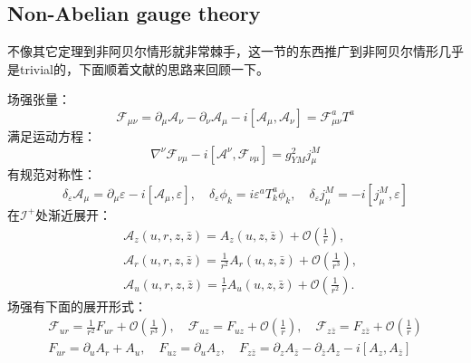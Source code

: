 \subsection{Non-Abelian gauge theory}
不像其它定理到非阿贝尔情形就非常棘手，这一节的东西推广到非阿贝尔情形几乎是trivial的，下面顺着文献\cite{He:2015zea,Nande:2017dba}的思路来回顾一下。

场强张量：
\begin{equation}
	\mathcal{F}_{\mu\nu}=\partial_\mu\mathcal{A}_\nu-\partial_\nu\mathcal{A}_\mu-i\left[\mathcal{A}_\mu,\mathcal{A}_\nu\right]=\mathcal{F}_{\mu\nu}^aT^a
\end{equation}
满足运动方程：
\begin{equation}
	\nabla^\nu\mathcal{F}_{\nu\mu}-i\left[\mathcal{A}^\nu,\mathcal{F}_{\nu\mu}\right]=g_{YM}^2j_{\mu}^M
\end{equation}
有规范对称性：
\begin{equation}
	\delta_{\varepsilon}\mathcal{A}_{\mu}=\partial_{\mu}\varepsilon-i\left[\mathcal{A}_{\mu},\varepsilon\right],\quad\delta_{\varepsilon}\phi_{k}=i\varepsilon^{a}T_{k}^{a}\phi_{k},\quad\delta_{\varepsilon}j_{\mu}^{M}=-i\left[j_{\mu}^{M},\varepsilon\right]
\end{equation}
在$\mathcal{I}^{+}$处渐近展开：
\begin{equation}
	\begin{aligned}
		&\mathcal{A}_z(u,r,z,\bar{z}) =A_z(u,z,\bar{z})+\mathcal{O}\left(\frac1r\right),  \\
		&\mathcal{A}_r(u,r,z,\bar{z}) =\frac1{r^2}A_r(u,z,\bar{z})+\mathcal{O}\left(\frac1{r^3}\right),  \\
		&\mathcal{A}_{u}(u,r,z,\bar{z}) =\frac1rA_u(u,z,\bar{z})+\mathcal{O}\left(\frac1{r^2}\right). 
	\end{aligned}
\end{equation}
场强有下面的展开形式：
\begin{equation}
	\begin{gathered}
		\mathcal{F}_{ur}=\frac1{r^2}F_{ur}+\mathcal{O}\left(\frac1{r^3}\right),\quad\mathcal{F}_{uz}=F_{uz}+\mathcal{O}\left(\frac1r\right),\quad\mathcal{F}_{z\bar{z}}=F_{z\bar{z}}+\mathcal{O}\left(\frac1r\right)\\
		F_{ur}=\partial_{u}A_{r}+A_{u},\quad F_{uz}=\partial_{u}A_{z},\quad F_{z\bar{z}}=\partial_{z}A_{\bar{z}}-\partial_{\bar{z}}A_{z}-i\left[A_{z},A_{\bar{z}}\right]
	\end{gathered}
\end{equation}
